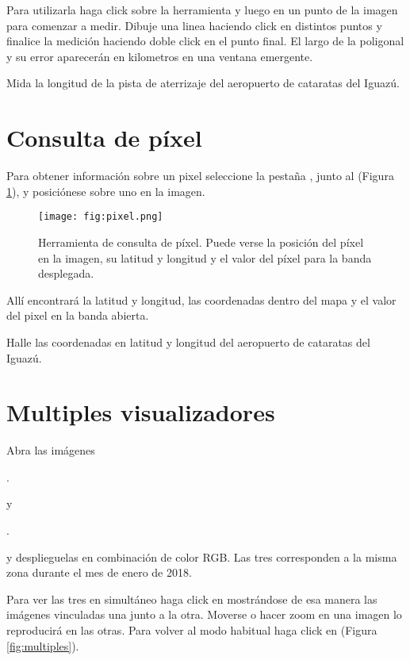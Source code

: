 Para utilizarla haga click sobre la herramienta y luego en un punto de la imagen para comenzar a medir. Dibuje una linea haciendo click en distintos puntos y finalice la medición haciendo doble click en el punto final. El largo de la poligonal y su error aparecerán en kilometros en una ventana emergente.

Mida la longitud de la pista de aterrizaje del aeropuerto de cataratas del Iguazú.

\section{Consulta de píxel}

Para obtener información sobre un pixel seleccione la pestaña , junto al  (Figura \ref{fig:pixel}), y posiciónese sobre uno en la imagen.

\begin{figure}[h!]
    \centering
    \texttt{[image: fig:pixel.png]}
    \caption{Herramienta de consulta de píxel. Puede verse la posición del píxel en la imagen, su latitud y longitud y el valor del píxel para la banda desplegada.}
    \label{fig:pixel}
\end{figure}

Allí encontrará la latitud y longitud, las coordenadas dentro del mapa y el valor del pixel en la banda abierta.

Halle las coordenadas en latitud y longitud del aeropuerto de cataratas del Iguazú.

\section{Multiples visualizadores}

Abra las imágenes
\begin{center} .
\end{center}
y
\begin{center} .
\end{center}

y desplieguelas en combinación de color RGB. Las tres corresponden a la misma zona durante el mes de enero de 2018.

Para ver las tres en simultáneo haga click en  mostrándose de esa manera las imágenes vinculadas una junto a la otra. Moverse o hacer zoom en una imagen lo reproducirá en las otras. Para volver al modo habitual haga click en  (Figura \ref{fig:multiples}).

